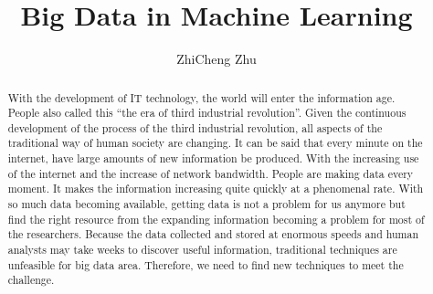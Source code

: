 \documentclass[sigconf]{acmart}
\begin{document}
\title{Big Data in Machine Learning}


\author{ZhiCheng Zhu}


\begin{abstract}

    With the development of IT technology, the world will enter the information age. People also called this ``the era of third industrial revolution''. Given the continuous development of the process of the third industrial revolution, all aspects of the traditional way of human society are changing. It can be said that every minute on the internet, have large amounts of new information be produced. With the increasing use of the internet and the increase of network bandwidth. People are making data every moment. It makes the information increasing quite quickly at a phenomenal rate. With so much data becoming available, getting data is not a problem for us anymore but find the right resource from the expanding information becoming a problem for most of the researchers. Because the data collected and stored at enormous speeds and human analysts may take weeks to discover useful information, traditional techniques are unfeasible for big data area. Therefore, we need to find new techniques to meet the challenge.
    
\end{abstract}


\maketitle
\end{document}
